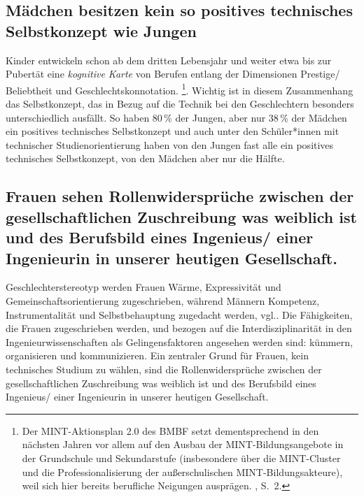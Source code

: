 \documentclass[a4paper, 12 pt]{IEEEtran}
\begin{document}
\subsection{Mädchen besitzen kein so positives technisches Selbstkonzept wie Jungen}
Kinder entwickeln schon ab dem dritten Lebensjahr und weiter etwa bis zur Pubertät eine \emph{kognitive Karte} von Berufen entlang der Dimensionen Prestige/ Beliebtheit und Geschlechtskonnotation. \cite{BMBF.2022}\footnote{Der MINT-Aktionsplan 2.0 des BMBF setzt dementsprechend in den nächsten Jahren vor allem auf den Ausbau der MINT-Bildungsangebote in der Grundschule und Sekundarstufe (insbesondere über die MINT-Cluster und die Professionalisierung der außerschulischen MINT-Bildungsakteure), weil sich hier bereits berufliche Neigungen ausprägen.  \cite{BMBF.2022}, S.~2.}.  
Wichtig ist in diesem Zusammenhang das Selbstkonzept, das in Bezug auf die Technik bei den Geschlechtern besonders unterschiedlich ausfällt. So haben $80\,\%$ der Jungen, aber nur $38\,\%$ der Mädchen ein positives technisches Selbstkonzept und auch unter den Schüler*innen mit technischer Studienorientierung haben von den Jungen fast alle ein positives technisches Selbstkonzept, von den Mädchen aber nur die Hälfte. \cite{Wensierski.2015}

\subsection{Frauen sehen Rollenwidersprüche zwischen der gesellschaftlichen Zuschreibung was weiblich ist und des Berufsbild eines Ingenieus/ einer Ingenieurin in unserer heutigen Gesellschaft.}

Geschlechterstereotyp werden Frauen Wärme, Expressivität und Gemeinschaftsorientierung zugeschrieben, während Männern Kompetenz, Instrumentalität und Selbstbehauptung zugedacht werden, vgl.\cite{Eckes.2004}. Die Fähigkeiten, die Frauen zugeschrieben werden, und bezogen auf die Interdisziplinarität in den Ingenieurwissenschaften als Gelingensfaktoren angesehen werden sind: kümmern, organisieren und kommunizieren.
Ein zentraler Grund für Frauen, kein technisches Studium zu wählen, sind die Rollenwidersprüche zwischen der gesellschaftlichen Zuschreibung was weiblich ist und des Berufsbild eines Ingenieus/ einer Ingenieurin in unserer heutigen Gesellschaft.
\cite{Hausotter.2022} 
\end{document}
